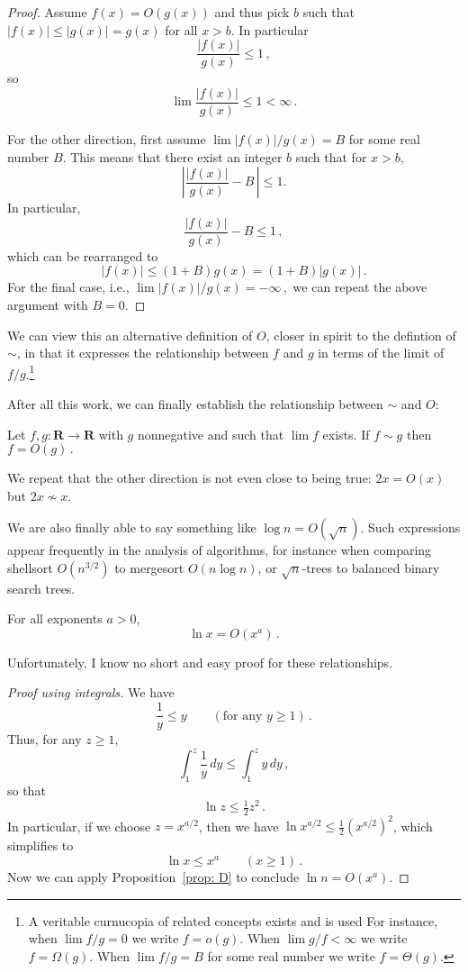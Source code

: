 \documentclass{tstextbook}
\begin{document}
\begin{proof}
  Assume $f(x)=O(g(x))$ and thus pick $b$ such that $|f(x)|\leq |g(x)| = g(x)$ for all $x>b$.
  In particular \[\frac{|f(x)|}{g(x)} \leq 1\,,\]
  so \[\lim \frac{|f(x)|}{g(x)} \leq 1< \infty\,.\]
  
  For the other direction, first assume
  \( \lim |f(x)|/ g(x) = B \)
  for some real number $B$.
  This means that there exist an integer $b$ such that for $x>b$,
  \[  \left|\frac{|f(x)|}{g(x)} - B\, \right| \leq 1.\]
  In particular,
  \[ \frac{|f(x)|}{g(x)} - B \leq 1\,,\]
  which can be rearranged to 
  \[ |f(x)| \leq (1+ B)g(x) = (1+B)|g(x)|\,.\]
  For the final case, i.e.,
  \( \lim |f(x)|/ g(x) = -\infty\,, \)
  we can repeat the above argument with $B=0$.
\end{proof}

We can view this an alternative definition of $O$, closer in spirit to the defintion of $\sim$, in that it expresses the relationship between $f$ and $g$ in terms of the limit of $f/g$.\footnote{
  A veritable curnucopia of related concepts exists and is used 
  For instance, when $\lim f/g =0$ we write $f=o(g)$.
  When $\lim g/f < \infty$ we write $f=\Omega(g)$.
  When $\lim f/g = B$ for some real number we write $f=\Theta(g)$.
}

After all this work, we can finally establish the relationship between $\sim$ and $O$:

\begin{theorem}\label{prop: tilde implies Oh}
  Let $f,g\colon\mathbf R\rightarrow\mathbf R$ with $g$ nonnegative and such that $\lim f$ exists.
  If $f\sim g$ then  \( f=O(g)\,. \)
\end{theorem}

We repeat that the other direction is not even close to being true: $2x =O(x)$ but $2x\not\sim x$.

\medskip
We are also finally able to say something like \(\log n = O(\sqrt{n})\).
Such expressions appear frequently in the analysis of algorithms, for instance when comparing shellsort \(O(n^{3/2})\) to mergesort \(O(n\log n)\), or \(\sqrt{n}\)-trees to balanced binary search trees.


\begin{theorem}
For all exponents \(a>0\), \[ \ln x = O(x^a)\,.\]
\end{theorem}

Unfortunately, I know no short and easy proof for these relationships.

\begin{proof}[Proof using integrals]
We have
\[
\frac{1}{y} \leq y \qquad(\text{for any } y \geq 1)\,.
\]
Thus, for any \(z\geq 1\),
\[
\int_1^z \frac{1}{y} \,dy\leq  \int_1^z y\, dy \,,
\]
so that \[ \ln z \leq \tfrac{1}{2} z^2\,.\]
In particular, if we choose \(z = x^{a/2}\),
then we have \( \ln x^{a/2} \leq \frac{1}{2} (x^{a/2})^2\), which simplifies to
\[  \ln x \leq    x^a\qquad(x\geq 1)\,. \]
  Now we can apply Proposition~\ref{prop: D} to conclude \(\ln n = O(x^a)\).
\end{proof}
\end{document}
